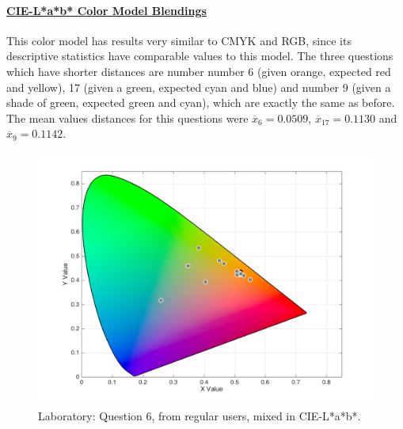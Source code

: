 \paragraph{\ul{CIE-L*a*b* Color Model Blendings}} \par
\label{par:labcolormodel}
%
This color model has results very similar to CMYK and RGB, since its descriptive statistics have comparable values to this model.
The three questions which have shorter distances are number number 6 (given orange, expected red and yellow), 17 (given a green, expected cyan and blue) and number 9 (given a shade
of green, expected green and cyan), which are exactly the same as before. The mean values distances for this questions were $\overline{x}_{6} = 0.0509$, $\overline{x}_{17} = 0.1130$ and $\overline{x}_{9} = 0.1142$. \par
%
\begin{figure}[!htbp]
  \centering
  \vspace{-10pt}
  \begin{minipage}{0.4\textwidth}
    \centering
    \includegraphics[width=\textwidth]{images/results/6_lab_Labresponses.png}
    \caption[Laboratory: Answers for Question 6, from regular users, mixed in CIE-L*a*b* Color Model.]{Laboratory: Question 6, from regular users, mixed in CIE-L*a*b*.}
    \label{fig:lablabregular_6}
  \end{minipage}
  \begin{minipage}{0.4\textwidth}
    \centering

\end{minipage}
\end{figure}
